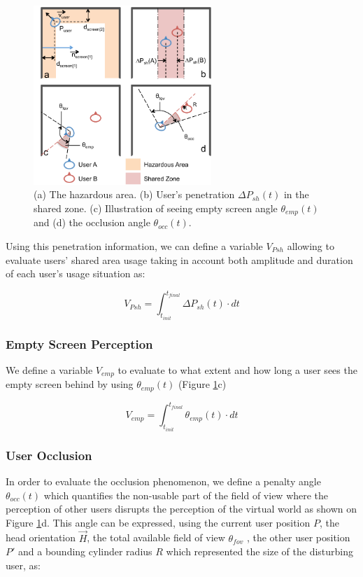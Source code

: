 \begin{figure}[tb]
  \centering
  \includegraphics[width=0.6\textwidth]{figures/ch4/cohab_metrics}
  \caption{\label{fig:4_metrics}(a) The hazardous area. (b) User's penetration $\Delta P_{sh}(t)$ in the shared zone. (c) Illustration of seeing empty screen angle $\theta_{emp}(t)$ and (d) the occlusion angle $\theta_{occ}(t)$.}
\end{figure}

Using this penetration information, we can define a variable $V_{Psh}$ allowing to evaluate users' shared area usage taking in account both amplitude and duration of each user's usage situation as:

\begin{equation}
V_{Psh}=\int_{t_{init}}^{t_{final}}\Delta P_{sh}(t)\cdot dt
\end{equation}

\subsubsection{Empty Screen Perception}
We define a variable $V_{emp}$ to evaluate to what extent and how long a user sees the empty screen behind by using $\theta_{emp}(t)$ (Figure \ref{fig:4_metrics}c)

\begin{equation}
V_{emp}=\int_{t_{init}}^{t_{final}}\theta_{emp}(t)\cdot dt
\end{equation}

\subsubsection{User Occlusion}
In order to evaluate the occlusion phenomenon, we define a penalty angle $\theta_{occ}(t)$ which quantifies the non-usable part of the field of view where the perception of other users disrupts the perception of the virtual world as shown on Figure \ref{fig:4_metrics}d. This angle can be expressed, using the current user position $P$, the head orientation $\overrightarrow{H}$, the total available field of view $\theta_{fov}$ , the other user position $P'$ and a bounding cylinder radius $R$ which represented the size of the disturbing user, as:


